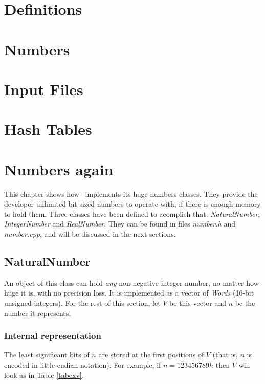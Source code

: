 \documentclass[a4paper,draft,12pt]{book}
\begin{document}
\chapter{Definitions\label{chaprefs}}

\chapter{Numbers\label{chapnums}}

\chapter{Input Files\label{chapinp}}

\chapter{Hash Tables\label{chaphash}}

\chapter{Numbers again\label{chapnumsagain}}
This chapter shows how \popasm\ implements its huge numbers classes.
They provide the developer unlimited bit sized numbers to operate
with, if there is enough memory to hold them. Three classes have
been defined to acomplish that: \emph{NaturalNumber}, \emph{IntegerNumber}
and \emph{RealNumber}. They can be found in files \emph{number.h} and
\emph{number.cpp}, and will be discussed in the next sections.

\section{NaturalNumber}
An object of this class can hold \emph{any} non-negative integer number,
no matter how huge it is, with no precision loss. It is implemented
as a vector of \emph{Words} (16-bit unsigned integers). For the rest of
this section, let $V$ be this vector and $n$ be the number it represents.

\subsection{Internal representation\label{intrep}}
The least significant bits of $n$ are stored at the first positions of $V$
(that is, $n$ is encoded in little-endian notation).
For example\footnotemark, if $n = 123456789h$ then $V$ will look as in Table \ref{tabexv}.
\end{document}
